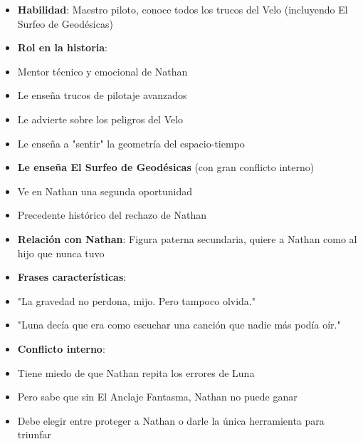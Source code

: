 \documentclass[11pt,a4paper]{report}
\begin{document}
\begin{itemize}
  \item \textbf{Habilidad}: Maestro piloto, conoce todos los trucos del Velo (incluyendo El Surfeo de Geodésicas)
  \item \textbf{Rol en la historia}: 
  \item Mentor técnico y emocional de Nathan
  \item Le enseña trucos de pilotaje avanzados
  \item Le advierte sobre los peligros del Velo
  \item Le enseña a "sentir" la geometría del espacio-tiempo
  \item \textbf{Le enseña El Surfeo de Geodésicas} (con gran conflicto interno)
  \item Ve en Nathan una segunda oportunidad
  \item Precedente histórico del rechazo de Nathan
  \item \textbf{Relación con Nathan}: Figura paterna secundaria, quiere a Nathan como al hijo que nunca tuvo
  \item \textbf{Frases características}: 
  \item "La gravedad no perdona, mijo. Pero tampoco olvida."
  \item "Luna decía que era como escuchar una canción que nadie más podía oír."
  \item \textbf{Conflicto interno}: 
  \item Tiene miedo de que Nathan repita los errores de Luna
  \item Pero sabe que sin El Anclaje Fantasma, Nathan no puede ganar
  \item Debe elegir entre proteger a Nathan o darle la única herramienta para triunfar

\end{itemize}
\end{document}
